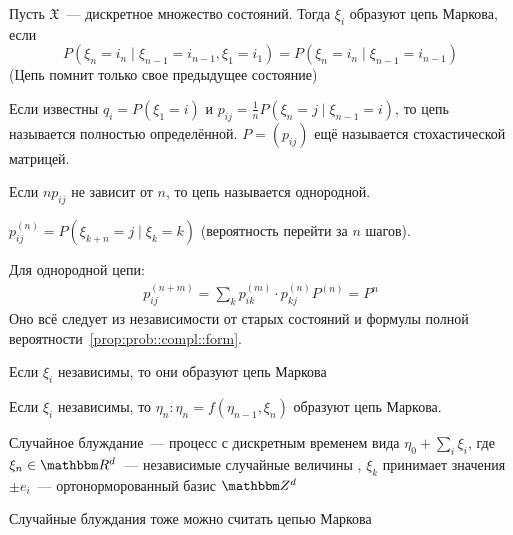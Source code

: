 \documentclass[12pt, timbord]{../../../notes}
\begin{document}
\begin{defn}\label{defn:proc::markchain::chain}
  Пусть $\mathfrak X$~--- дискретное множество состояний. Тогда $\xi_i$ образуют цепь Маркова, если 
  \[
    P(\xi_n = i_n \mid \xi_{n-1} = i_{n-1}, \xi_1 = i_1) = P(\xi_n = i_n \mid \xi_{n-1} = i_{n-1})
  \]
  (Цепь помнит только свое предыдущее состояние)
\end{defn}

\begin{defn}\label{defn:proc::markchain::def}
  Если известны $q_i = P(\xi_1=i)$ и $p_{ij} = \frac{1}{n} P(\xi_n = j \mid \xi_{n-1} = i) $, то
  цепь называется полностью определённой. $P = (p_{ij})$ ещё называется стохастической матрицей. 
\end{defn}

\begin{defn}\label{defn:proc::markchain::homo}
  Если $n p_{ij}$ не зависит от $n$, то цепь называется однородной. 
\end{defn}

\begin{defn}\label{defn:proc::markchain::trannstep}
  $p^{(n)}_{ij} = P(\xi_{k+n} = j \mid \xi_{k} =k) $ (вероятность перейти за $n$ шагов). 
\end{defn}

\begin{prop}\label{prop:proc::markchain::trmul}
  Для однородной цепи:
  \begin{align*}
    p^{(n+m)}_{ij} = \sum_k p_{ik}^{(m)} \cdot p_{kj}^{(n)}
    P^(n) = P^n
  \end{align*}
  Оно всё следует из независимости от старых состояний и формулы полной 
  вероятности~\ref{prop:prob::compl::form}.
\end{prop}

\begin{exmp}\label{exmp:proc::markchain::ind}
  Если $\xi_i$ независимы, то они образуют цепь Маркова  
\end{exmp}
\begin{exmp}\label{exmp:proc::markchain::func}
  Если $\xi_i$ независимы, то $\eta_n \colon \eta_n = f(\eta_{n-1}, \xi_n)$ образуют цепь Маркова.
\end{exmp}

\begin{defn}\label{exmp:proc::markchain::randomwalk}
  Случайное блуждание~--- процесс с дискретным временем вида $\eta_0 + \sum_i \xi_i$, где
   $\xi_n \in \R^d$~--- независимые случайные величины , $\xi_k$ принимает значения $\pm e_i$~---
   ортонорморованный базис $\Z^d$
\end{defn}
Случайные блуждания тоже можно считать цепью Маркова
\end{document}
